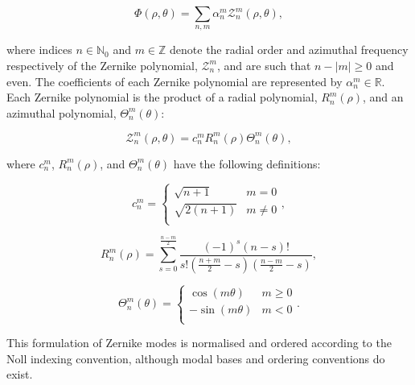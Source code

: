 \begin{equation}\label{eq:phase_zernike_expansion}
\Phi\left(\rho,\theta\right) = \sum\limits_{n,m}\alpha^{m}_{n}\mathcal{Z}^{m}_{n}\left(\rho,\theta\right),
\end{equation}

where indices $n \in \mathbb{N}_{0}$ and $m \in \mathbb{Z}$ denote the radial order 
and azimuthal frequency respectively of the Zernike polynomial, 
$\mathcal{Z}^{m}_{n}$, and are such that $n - \left|m\right| \ge 0$ and even. The
coefficients of each Zernike polynomial are represented by $\alpha^{m}_{n} \in 
\mathbb{R}$. Each Zernike polynomial is the product of a radial polynomial,
$R^{m}_{n}(\rho)$, and an azimuthal polynomial, $\Theta^{m}_{n}(\theta)$:

\begin{equation}\label{eq:zernike_polynomial}
\mathcal{Z}^{m}_{n}\left(\rho,\theta\right) = c^{m}_{n}R^{m}_{n}(\rho)\Theta^{m}_{n}(\theta),
\end{equation}

where $c^{m}_{n}$, $R^{m}_{n}(\rho)$, and $\Theta^{m}_{n}(\theta)$ have the following definitions:

\begin{equation}\label{eq:zernike_polynomial_c}
c^{m}_{n} = 
\begin{cases}
\sqrt{n + 1} & m = 0\\
\sqrt{2(n + 1)} & m \ne 0\\
\end{cases},
\end{equation}

\begin{equation}\label{eq:zernike_polynomial_R}
R^{m}_{n}(\rho) = \sum_{s=0}^{\frac{n-m}{2}}{\frac{(-1)^{s}(n-s)!}{s!\left(\frac{n+m}{2}-s\right)\left(\frac{n-m}{2}-s\right)}},
\end{equation}

\begin{equation}\label{eq:zernike_polynomial_Theta}
\Theta^{m}_{n}(\theta) =
\begin{cases}
\cos(m\theta) & m \ge 0\\
-\sin(m\theta) & m < 0\\
\end{cases}.
\end{equation}

This formulation of Zernike modes is normalised and ordered according
to the Noll indexing convention, although modal bases and ordering 
conventions do exist\cite{noll1976zernike,thibos2002standards,
	loomis1978computer,soloviev2017optimal,burton1984effects}. 

